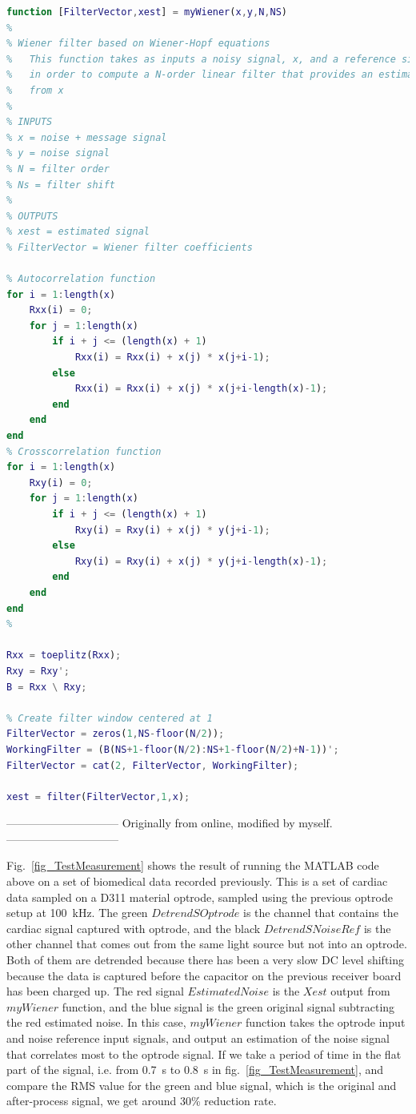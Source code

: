 \begin{lstlisting}[language=matlab]
function [FilterVector,xest] = myWiener(x,y,N,NS)
%
% Wiener filter based on Wiener-Hopf equations
%   This function takes as inputs a noisy signal, x, and a reference signal, y,
%   in order to compute a N-order linear filter that provides an estimate of y
%   from x
%  
% INPUTS
% x = noise + message signal
% y = noise signal
% N = filter order
% Ns = filter shift
%
% OUTPUTS
% xest = estimated signal
% FilterVector = Wiener filter coefficients

% Autocorrelation function
for i = 1:length(x)
    Rxx(i) = 0;
    for j = 1:length(x)
        if i + j <= (length(x) + 1)
            Rxx(i) = Rxx(i) + x(j) * x(j+i-1);
        else
            Rxx(i) = Rxx(i) + x(j) * x(j+i-length(x)-1);
        end
    end
end
% Crosscorrelation function
for i = 1:length(x)
    Rxy(i) = 0;
    for j = 1:length(x)
        if i + j <= (length(x) + 1)
            Rxy(i) = Rxy(i) + x(j) * y(j+i-1);
        else
            Rxy(i) = Rxy(i) + x(j) * y(j+i-length(x)-1);
        end
    end
end
%

Rxx = toeplitz(Rxx);
Rxy = Rxy';
B = Rxx \ Rxy;

% Create filter window centered at 1
FilterVector = zeros(1,NS-floor(N/2));
WorkingFilter = (B(NS+1-floor(N/2):NS+1-floor(N/2)+N-1))';
FilterVector = cat(2, FilterVector, WorkingFilter);

xest = filter(FilterVector,1,x);
\end{lstlisting}

------------------------------
Originally from online, modified by myself.
------------------------------

Fig.~\ref{fig_TestMeasurement} shows the result of running the MATLAB code above on a set of biomedical data recorded previously.  This is a set of cardiac data sampled on a D311 material optrode, sampled using the previous optrode setup at \qty{100}{kHz}.  The green $Detrend SOptrode$ is the channel that contains the cardiac signal captured with optrode, and the black $ Detrend SNoiseRef$ is the other channel that comes out from the same light source but not into an optrode.  Both of them are detrended because there has been a very slow DC level shifting because the data is captured before the capacitor on the previous receiver board has been charged up.  The red signal $Estimated Noise$ is the $Xest$ output from $myWiener$ function, and the blue signal is the green original signal subtracting the red estimated noise.  In this case, $myWiener$ function takes the optrode input and noise reference input signals, and output an estimation of the noise signal that correlates most to the optrode signal.  If we take a period of time in the flat part of the signal, i.e. from \qty{0.7}{s} to \qty{0.8}{s} in fig.~\ref{fig_TestMeasurement}, and compare the RMS value for the green and blue signal, which is the original and after-process signal, we get around 30\% reduction rate.  


